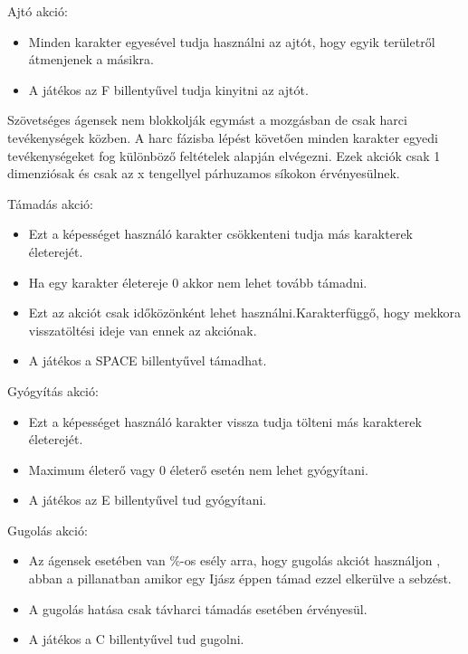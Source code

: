 Ajtó akció:

\begin{itemize}
  \item Minden karakter egyesével tudja használni az ajtót, hogy egyik területről átmenjenek a másikra.
  \item A játékos az F billentyűvel tudja kinyitni az ajtót.
\end{itemize}



Szövetséges ágensek nem blokkolják egymást a mozgásban de csak harci tevékenységek közben.
\newline
A harc fázisba lépést követően minden karakter egyedi tevékenységeket fog különböző feltételek alapján elvégezni.
\newline
Ezek akciók csak 1 dimenziósak és csak az x tengellyel párhuzamos síkokon érvényesülnek.

Támadás akció:

\begin{itemize}
\item Ezt a képességet használó karakter csökkenteni tudja más karakterek életerejét.
\item Ha egy karakter életereje 0 akkor nem lehet tovább támadni.
\item Ezt az akciót csak időközönként lehet használni.Karakterfüggő, hogy mekkora visszatöltési ideje van ennek az akciónak.
\item A játékos a SPACE billentyűvel támadhat.
\end{itemize}

Gyógyítás akció:

\begin{itemize}
  \item Ezt a képességet használó karakter vissza tudja tölteni más karakterek életerejét.
  \item Maximum életerő vagy 0 életerő esetén nem lehet gyógyítani.
  \item A játékos az E billentyűvel tud gyógyítani.
\end{itemize}

Gugolás akció:

\begin{itemize}
  \item Az ágensek esetében van \%-os esély arra, hogy gugolás akciót használjon , abban a pillanatban amikor egy Ijász éppen támad ezzel elkerülve a sebzést.
  \item A gugolás hatása csak távharci támadás esetében érvényesül.
  \item A játékos a C billentyűvel tud gugolni.
\end{itemize}

